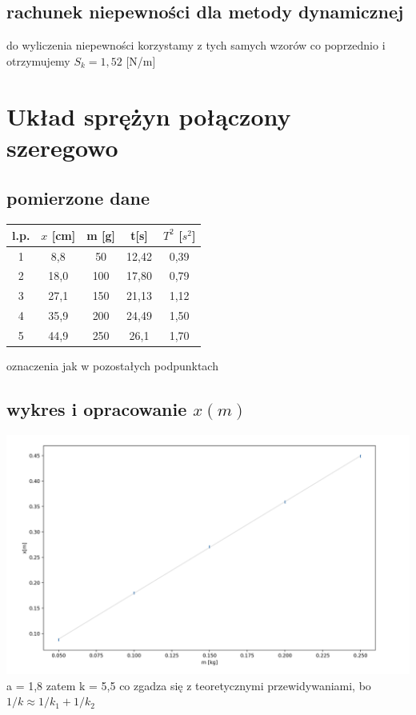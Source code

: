 \documentclass{article}
\begin{document}
\subsection{rachunek niepewności dla metody dynamicznej}
do wyliczenia niepewności korzystamy z tych samych wzorów co poprzednio i otrzymujemy
$S_k = 1, 52$ [N/m]

\section{Układ sprężyn połączony szeregowo}
\subsection{pomierzone dane}
\begin{center}
\begin{tabular}{ c | c | c | c | c  }
l.p. & $x$ [cm] & m [g] & t[s]  & $T^2$ [$s^2$]\\
\hline
 1 & 8,8   & 50 & 12,42 & 0,39\\ 
 2 & 18,0   & 100 &17,80 & 0,79\\ 
 3 & 27,1   & 150 & 21,13 & 1,12\\ 
 4 & 35,9  & 200 & 24,49 & 1,50\\
 5 & 44,9 & 250 & 26,1 & 1,70\\


\end{tabular}
\end{center}
oznaczenia jak w pozostałych podpunktach

\subsection{wykres i opracowanie $x(m)$}
\includegraphics[width=15cm]{m7_5a}
a = 1,8 zatem k = 5,5 co zgadza się z teoretycznymi przewidywaniami, bo $1/k \approx 1/k_1 + 1/k_2$
\end{document}
